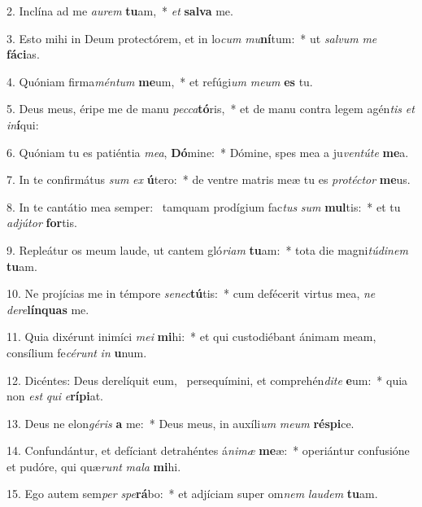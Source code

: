2. Inclína ad me \textit{au}\textit{rem} \textbf{tu}am,~*  \textit{et} \textbf{sal}\textbf{va} me.\

3. Esto mihi in Deum protectórem, et in lo\textit{cum} \textit{mu}\textbf{ní}tum:~*  ut \textit{sal}\textit{vum} \textit{me} \textbf{fá}\textbf{ci}as.\

4. Quóniam firma\textit{mén}\textit{tum} \textbf{me}um,~*  et refúgi\textit{um} \textit{me}\textit{um} \textbf{es} tu.\

5. Deus meus, éripe me de manu \textit{pec}\textit{ca}\textbf{tó}ris,~*  et de manu contra legem agén\textit{tis} \textit{et} \textit{in}\textbf{í}qui:\

6. Quóniam tu es patiéntia \textit{me}\textit{a}, \textbf{Dó}mine:~*  Dómine, spes mea a ju\textit{ven}\textit{tú}\textit{te} \textbf{me}a.\

7. In te confirmátus \textit{sum} \textit{ex} \textbf{ú}tero:~*  de ventre matris meæ tu es \textit{pro}\textit{téc}\textit{tor} \textbf{me}us.\

8. In te cantátio mea semper: \dag\  tamquam prodígium fac\textit{tus} \textit{sum} \textbf{mul}tis:~*  et tu \textit{ad}\textit{jú}\textit{tor} \textbf{for}tis.\

9. Repleátur os meum laude, ut cantem gló\textit{ri}\textit{am} \textbf{tu}am:~*  tota die magni\textit{tú}\textit{di}\textit{nem} \textbf{tu}am.\

10. Ne projícias me in témpore \textit{se}\textit{nec}\textbf{tú}tis:~*  cum defécerit virtus mea, \textit{ne} \textit{de}\textit{re}\textbf{lín}\textbf{quas} me.\

11. Quia dixérunt inimíci \textit{me}\textit{i} \textbf{mi}hi:~*  et qui custodiébant ánimam meam, consílium fe\textit{cé}\textit{runt} \textit{in} \textbf{u}num.\

12. Dicéntes: Deus derelíquit eum, \dag\  persequímini, et comprehén\textit{di}\textit{te} \textbf{e}um:~*  quia non \textit{est} \textit{qui} \textit{e}\textbf{rí}\textbf{pi}at.\

13. Deus ne elon\textit{gé}\textit{ris} \textbf{a} me:~*  Deus meus, in auxíli\textit{um} \textit{me}\textit{um} \textbf{ré}\textbf{spi}ce.\

14. Confundántur, et defíciant detrahéntes á\textit{ni}\textit{mæ} \textbf{me}æ:~*  operiántur confusióne et pudóre, qui quæ\textit{runt} \textit{ma}\textit{la} \textbf{mi}hi.\

15. Ego autem sem\textit{per} \textit{spe}\textbf{rá}bo:~*  et adjíciam super om\textit{nem} \textit{lau}\textit{dem} \textbf{tu}am.\

